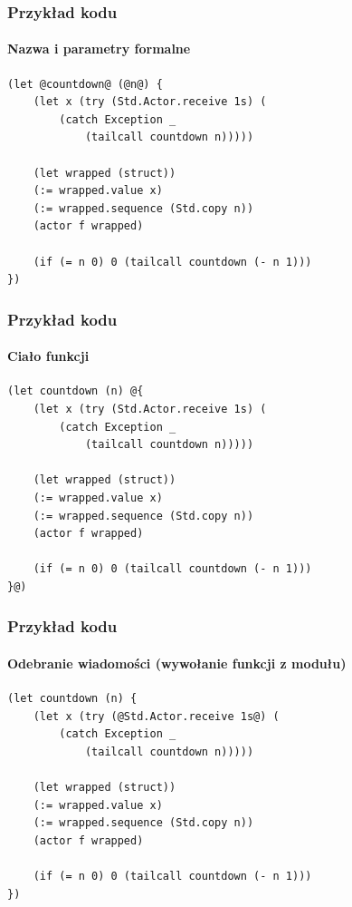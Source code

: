 \documentclass[aspectratio=169]{beamer}
\begin{document}
\begin{frame}[fragile]
    \frametitle{Przykład kodu}
    \framesubtitle{Nazwa i parametry formalne}

    \begin{small}
    \begin{lstlisting}
(let @countdown@ (@n@) {
    (let x (try (Std.Actor.receive 1s) (
        (catch Exception _
            (tailcall countdown n)))))

    (let wrapped (struct))
    (:= wrapped.value x)
    (:= wrapped.sequence (Std.copy n))
    (actor f wrapped)

    (if (= n 0) 0 (tailcall countdown (- n 1)))
})
    \end{lstlisting}
    \end{small}
\end{frame}

\begin{frame}[fragile]
    \frametitle{Przykład kodu}
    \framesubtitle{Ciało funkcji}

    \begin{small}
    \begin{lstlisting}
(let countdown (n) @{
    (let x (try (Std.Actor.receive 1s) (
        (catch Exception _
            (tailcall countdown n)))))

    (let wrapped (struct))
    (:= wrapped.value x)
    (:= wrapped.sequence (Std.copy n))
    (actor f wrapped)

    (if (= n 0) 0 (tailcall countdown (- n 1)))
}@)
    \end{lstlisting}
    \end{small}
\end{frame}

\begin{frame}[fragile]
    \frametitle{Przykład kodu}
    \framesubtitle{Odebranie wiadomości (wywołanie funkcji z modułu)}

    \begin{small}
    \begin{lstlisting}
(let countdown (n) {
    (let x (try (@Std.Actor.receive 1s@) (
        (catch Exception _
            (tailcall countdown n)))))

    (let wrapped (struct))
    (:= wrapped.value x)
    (:= wrapped.sequence (Std.copy n))
    (actor f wrapped)

    (if (= n 0) 0 (tailcall countdown (- n 1)))
})
    \end{lstlisting}
    \end{small}
\end{frame}
\end{document}
